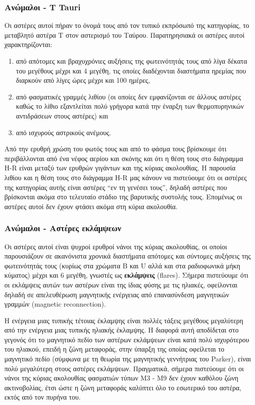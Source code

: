 \subsubsection{Ανώμαλοι - T Tauri}
Οι αστέρες αυτοί πήραν το όνομά τους από τον τυπικό εκπρόσωπό της κατηγορίας, το μεταβλητό αστέρα Τ στον αστερισμό του Ταύρου. Παρατηρησιακά οι αστέρες αυτοί χαρακτηρίζονται:
\begin{enumerate}
    \item από απότομες και βραχυχρόνιες αυξήσεις της φωτεινότητάς τους από λίγα δέκατα του μεγέθους μέχρι και 4 μεγέθη, τις οποίες διαδέχονται διαστήματα ηρεμίας που διαρκούν από λίγες ώρες μέχρι και 100 ημέρες,
    \item από φασματικές γραμμές λιθίου (οι οποίες δεν εμφανίζονται σε άλλους αστέρες καθώς το λίθιο εξαντλείται πολύ γρήγορα κατά την έναρξη των θερμοπυρηνικών αντιδράσεων στους αστέρες) και
    \item από ισχυρούς αστρικούς ανέμους.
\end{enumerate}
Από την ερυθρή χρώση του φωτός τους και από το φάσμα τους βρίσκουμε ότι περιβάλλονται από ένα νέφος αερίου και σκόνης και ότι η θέση τους στο διάγραμμα H-R είναι μεταξύ των ερυθρών γιγάντων και της κύριας ακολουθίας. Η παρουσία λιθίου και η θέση τους στο διάγραμμα H-R μας κάνουν να πιστεύουμε ότι οι αστέρες της κατηγορίας αυτής είναι αστέρες ``εν τη γενέσει τους'', δηλαδή αστέρες που βρίσκονται ακόμα στο τελευταίο στάδιο της βαρυτικής συστολής τους. Επομένως οι αστέρες αυτοί δεν έχουν φτάσει ακόμα στη κύρια ακολουθία.

\subsubsection{Ανώμαλοι - Αστέρες εκλάμψεων}
Οι αστέρες αυτοί είναι ψυχροί ερυθροί νάνοι της κύριας ακολουθίας, οι οποίοι παρουσιάζουν σε ακανόνιστα χρονικά διαστήματα απότομες και σύντομες αυξήσεις της φωτεινότητάς τους (κυρίως στα χρώματα B και U αλλά και στα ραδιοφωνικά μήκη κύματος) μέχρι και 6 μεγέθη, γνωστές ως \textbf{εκλάμψεις} (flares). Σήμερα πιστεύουμε ότι οι εκλάμψεις αυτών των αστέρων είναι της ίδιας φύσης με τις ηλιακές, οφείλονται δηλαδή σε απελευθέρωση μαγνητικής ενέργειας από επανασύνδεση μαγνητικών γραμμών (magnetic reconnection).

Η ενέργεια μιας τυπικής τέτοιας έκλαμψης είναι πολλές τάξεις μεγέθους μεγαλύτερη από την ενέργεια μιας τυπικής ηλιακής έκλαμψης. Η διαφορά αυτή αποδίδεται στο γεγονός ότι το μαγνητικό πεδίο των αστέρων εκλάμψεων είναι κατά πολύ ισχυρότερου του ηλιακού, επειδή η ζώνη μεταφοράς, στην ύπαρξη της οποίας οφείλεται το μαγνητικό πεδίο (σύμφωνα με τη θεωρία της μαγνητικής γεννήτριας του Parker), είναι πολύ μεγαλύτερη στους αστέρες εκλάμψεων. Πραγματικά, σήμερα πιστεύουμε ότι οι νάνοι της κύριας ακολουθίας φασματιών τύπων Μ3 - Μ9 δεν έχουν καθόλου ζώνη ακτινοβολίας, έτσι ώστε η ζώνη μεταφοράς καλύπτει όλο το εσωτερικό του αστέρα, εκτός από τον πυρήνα του.

